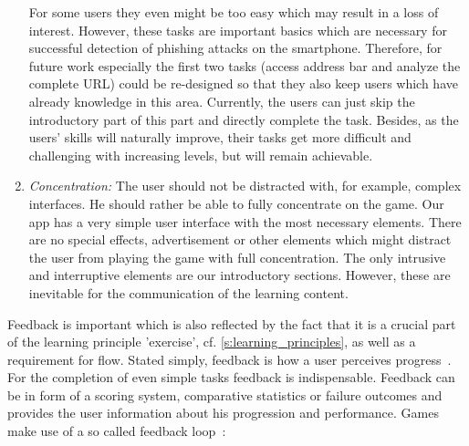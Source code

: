 \begin{description}[leftmargin=0cm]
\begin{enumerate}
For some users they even might be too easy which may result in a loss of interest.
However, these tasks are important basics which are necessary for successful detection of phishing attacks on the smartphone. 
Therefore, for future work especially the first two tasks (access address bar and analyze the complete URL) could be re-designed so that they also keep users which have already knowledge in this area.
Currently, the users can just skip the introductory part of this part and directly complete the task.
Besides, as the users' skills will naturally improve, their tasks get more difficult and challenging with increasing levels, but will remain achievable.
		\item \textit{Concentration:} The user should not be distracted with, for example, complex interfaces. 
He should rather be able to fully concentrate on the game. 
Our app has a very simple user interface with the most necessary elements. 
There are no special effects, advertisement or other elements which might distract the user from playing the game with full concentration.
The only intrusive and interruptive elements are our introductory sections. 
However, these are inevitable for the communication of the learning content.
	\end{enumerate}
	\item[Feedback:] Feedback is important which is also reflected by the fact that it is a crucial part of the learning principle 'exercise', cf. \autoref{s:learning_principles}, as well as a requirement for flow.
Stated simply, feedback is how a user perceives progress~\cite{csikszentmihalyi1990flow, csikszentmihalyi1997finding}.
For the completion of even simple tasks feedback is indispensable.
Feedback can be in form of a scoring system, comparative statistics or failure outcomes and provides the user information about his progression and performance.
Games make use of a so called feedback loop~\cite{goetz2011harnessing}:


\end{description}
